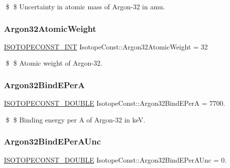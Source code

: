 \$ \$ Uncertainty in atomic mass of Argon-\/32 in amu. \mbox{\label{group___isotope_const-_argon-_ar32_ga17bbd71436a63e096d003bd7ede44cf5}} 
\subsubsection{\texorpdfstring{Argon32\+Atomic\+Weight}{Argon32AtomicWeight}}
{\footnotesize\ttfamily \mbox{\hyperlink{group___isotope_const-_macros_ga5f18360b3e99483a35c32d789e62621c}{I\+S\+O\+T\+O\+P\+E\+C\+O\+N\+S\+T\+\_\+\+I\+NT}} Isotope\+Const\+::\+Argon32\+Atomic\+Weight = 32}

\$ \$ Atomic weight of Argon-\/32. \mbox{\label{group___isotope_const-_argon-_ar32_gac4a45237f41f0ad503bab132ea27b4c3}} 
\subsubsection{\texorpdfstring{Argon32\+Bind\+E\+PerA}{Argon32BindEPerA}}
{\footnotesize\ttfamily \mbox{\hyperlink{group___isotope_const-_macros_ga8f45a7272ce02c0b4c65c44636ed719a}{I\+S\+O\+T\+O\+P\+E\+C\+O\+N\+S\+T\+\_\+\+D\+O\+U\+B\+LE}} Isotope\+Const\+::\+Argon32\+Bind\+E\+PerA = 7700.}

\$ \$ Binding energy per A of Argon-\/32 in keV. \mbox{\label{group___isotope_const-_argon-_ar32_ga1d7b38ea798194635ee65fc7a41dc59e}} 
\subsubsection{\texorpdfstring{Argon32\+Bind\+E\+Per\+A\+Unc}{Argon32BindEPerAUnc}}
{\footnotesize\ttfamily \mbox{\hyperlink{group___isotope_const-_macros_ga8f45a7272ce02c0b4c65c44636ed719a}{I\+S\+O\+T\+O\+P\+E\+C\+O\+N\+S\+T\+\_\+\+D\+O\+U\+B\+LE}} Isotope\+Const\+::\+Argon32\+Bind\+E\+Per\+A\+Unc = 0.}

